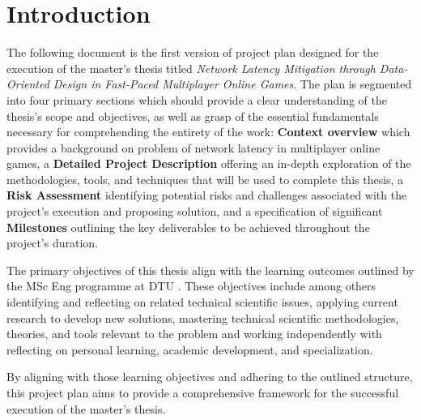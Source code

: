 \chapter{Introduction} 

The following document is the first version of project plan designed for the execution of the master's thesis titled \textit{Network Latency Mitigation through Data-Oriented Design in Fast-Paced Multiplayer Online Games}. The plan is segmented into four primary sections which should provide a clear understanding of the thesis's scope and objectives, as well as grasp of the essential fundamentals necessary for comprehending the entirety of the work: \textbf{Context overview} which provides a background on problem of network latency in multiplayer online games, a \textbf{Detailed Project Description} offering an in-depth exploration of the methodologies, tools, and techniques that will be used to complete this thesis, a \textbf{Risk Assessment} identifying potential risks and challenges associated with the project's execution and proposing solution, and a specification of significant \textbf{Milestones} outlining the key deliverables to be achieved throughout the project's duration.\newline

The primary objectives of this thesis align with the learning outcomes outlined by the MSc Eng programme at DTU \cite{DTU_master}. These objectives include among others identifying and reflecting on related technical scientific issues, applying current research to develop new solutions, mastering technical scientific methodologies, theories, and tools relevant to the problem and working independently with reflecting on personal learning, academic development, and specialization.\newline

By aligning with those learning objectives and adhering to the outlined structure, this project plan aims to provide a comprehensive framework for the successful execution of the master's thesis.\newline
